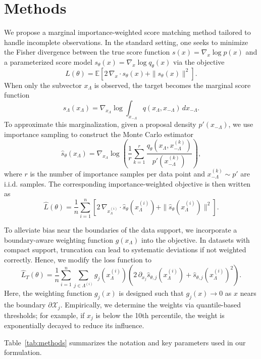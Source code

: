 \documentclass{article}
\begin{document}
\section{Methods}
We propose a marginal importance‐weighted score matching method tailored to handle incomplete observations. In the standard setting, one seeks to minimize the Fisher divergence between the true score function $s(x)=\nabla_x\log p(x)$ and a parameterized score model $s_\theta(x)=\nabla_x\log q_\theta(x)$ via the objective
\[
L(\theta)=\mathbb{E}\left[2\,\nabla_x\cdot s_\theta(x)+\|s_\theta(x)\|^2\right].
\]
When only the subvector $x_\Lambda$ is observed, the target becomes the marginal score function
\[
s_\Lambda(x_\Lambda)=\nabla_{x_\Lambda}\log\int_{x_{-\Lambda}}q(x_\Lambda,x_{-\Lambda})\,dx_{-\Lambda}.
\]
To approximate this marginalization, given a proposal density $p'(x_{-\Lambda})$, we use importance sampling to construct the Monte Carlo estimator
\[
\hat{s}_{\theta}(x_\Lambda) = \nabla_{x_\Lambda}\log\left(\frac{1}{r}\sum_{k=1}^{r}\frac{q_\theta(x_\Lambda,x_{-\Lambda}^{(k)})}{p'(x_{-\Lambda}^{(k)})}\right),
\]
where $r$ is the number of importance samples per data point and $x_{-\Lambda}^{(k)}\sim p'$ are i.i.d. samples. The corresponding importance-weighted objective is then written as 
\[
\hat{L}(\theta) = \frac{1}{n}\sum_{i=1}^n\left[2\,\nabla_{x_\Lambda^{(i)}}\cdot\hat{s}_{\theta}(x_\Lambda^{(i)})+\|\hat{s}_{\theta}(x_\Lambda^{(i)})\|^2\right].
\]

To alleviate bias near the boundaries of the data support, we incorporate a boundary-aware weighting function $g(x_\Lambda)$ into the objective. In datasets with compact support, truncation can lead to systematic deviations if not weighted correctly. Hence, we modify the loss function to
\[
\hat{L}_T(\theta) = \frac{1}{n}\sum_{i=1}^n\sum_{j\in\Lambda^{(i)}}g_j(x_\Lambda^{(i)})\left( 2\,\partial_{x_j}\hat{s}_{\theta,j}(x_\Lambda^{(i)})+\hat{s}_{\theta,j}(x_\Lambda^{(i)})^2\right).
\]
Here, the weighting function $g_j(x)$ is designed such that $g_j(x)\rightarrow 0$ as $x$ nears the boundary $\partial \mathcal{X}_j$. Empirically, we determine the weights via quantile-based thresholds; for example, if $x_j$ is below the 10th percentile, the weight is exponentially decayed to reduce its influence.

Table~\ref{tab:methods} summarizes the notation and key parameters used in our formulation.
\end{document}
